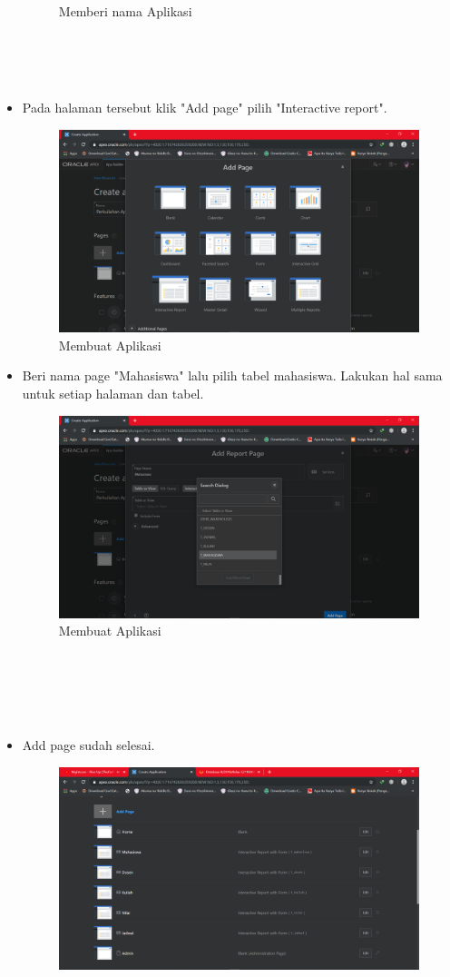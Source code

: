 \documentclass[12pt, times new roman]{article}
\begin{document}
\begin{itemize}
\begin{figure}[htbp]
	\caption{Memberi nama Aplikasi}
\end{figure}\\
\\
\\
\item Pada halaman tersebut klik "Add page" pilih "Interactive report".
\begin{figure}[htbp]
	\centering
	\includegraphics[width=10.5cm]{figures/Screenshot_15.png}
	\caption{Membuat Aplikasi}
\end{figure}
\item Beri nama page "Mahasiswa" lalu pilih tabel mahasiswa. Lakukan hal sama untuk setiap halaman dan tabel.
\begin{figure}[htbp]
	\centering
	\includegraphics[width=10.5cm]{figures/Screenshot_16.png}
	\caption{Membuat Aplikasi}
\end{figure}
\\
\\
\\
\\
\item Add page sudah selesai.
\begin{figure}[htbp]
	\centering
	\includegraphics[width=10.5cm]{figures/Screenshot_17.png}

\end{figure}
\end{itemize}
\end{document}
